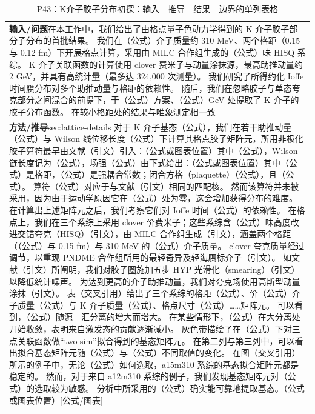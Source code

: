 \documentclass[UTF8,11pt,oneside]{ctexbook}
\begin{document}
\begin{table}[htbp]
  \centering
  \caption*{P43：K介子胶子分布初探：输入—推导—结果—边界的单列表格}
  \small
  \begin{tabular}{@{}p{}@{}}
    \toprule
    \textbf{输入/问题}\quad 在本工作中，我们给出了由格点量子色动力学得到的 K 介子胶子部分子分布的首批结果。 我们在（公式）介子质量约 310 MeV、两个格距（0.15 与 0.12 fm）下开展格点计算，采用由 MILC 合作组生成的（公式）味 HISQ 系综。 K 介子关联函数的计算使用 clover 费米子与动量涂抹源，最高助推动量约 2 GeV，并具有高统计量（最多达 324,000 次测量）。 我们研究了所得约化 Ioffe 时间赝分布对多个助推动量与格距的依赖性。 随后，我们在忽略胶子与单态夸克部分之间混合的前提下，于（公式）方案、（公式）GeV 处提取了 K 介子的胶子分布函数。 在较小格距处的结果与唯象测定相一致 \\
    \textbf{方法/推导}\quad sec:lattice-details 对于 K 介子基态（公式），我们在若干助推动量（公式）与 Wilson 线位移长度（公式）下计算其格点胶子矩阵元，所用非极化胶子算符最早由文献（引文）引入：（公式或图表位置）其中（公式），Wilson 链长度记为（公式），场强（公式）由下式给出：（公式或图表位置）其中（公式）是格距，（公式）是强耦合常数；闭合方格（plaquette）（公式），且（公式）。 算符（公式）对应于与文献（引文）相同的匹配核。 然而该算符并未被采用，因为由于运动学原因它在（公式）处为零，这会增加获得分布的难度。 在计算出上述矩阵元之后，我们考察它们对 Ioffe 时间（公式）的依赖性。 在格点上，我们在三个系综上采用 clover 价费米子；这些系综含（公式）味高度改进交错夸克（HISQ）（引文），由 MILC 合作组生成（引文），涵盖两个格距（（公式）与 0.15 fm）与 310 MeV 的（公式）介子质量。 clover 夸克质量经过调节，以重现 PNDME 合作组所用的最轻奇异及轻海赝标介子（引文）。 如文献（引文）所阐明，我们对胶子圈施加五步 HYP 光滑化（smearing）（引文）以降低统计噪声。 为达到更高的介子助推动量，我们对夸克场使用高斯型动量涂抹（引文）。 表（交叉引用）给出了三个系综的格距（公式）、价（公式）介子质量（公式）与 K 介子质量（公式）、格点尺寸（公式）……矩阵元。 可以看到，（公式）随源—汇分离的增大而增大。 在某些情形下，（公式）在大分离处开始收敛，表明来自激发态的贡献逐渐减小。 灰色带描绘了在（公式）下对三点关联函数做“two-sim”拟合得到的基态矩阵元。 在第二列与第三列中，可以看出拟合基态矩阵元随（公式）与（公式）不同取值的变化。 在图（交叉引用）所示的例子中，无论（公式）如何选取，a15m310 系综的基态拟合矩阵元都是稳定的。 然而，对于来自 a12m310 系综的例子，我们发现基态矩阵元对（公式）的选取较为敏感。 分析中所采用的（公式）确实能可靠地提取基态。（公式或图表位置）[公式/图表] \\

\end{tabular}
\end{table}
\end{document}
